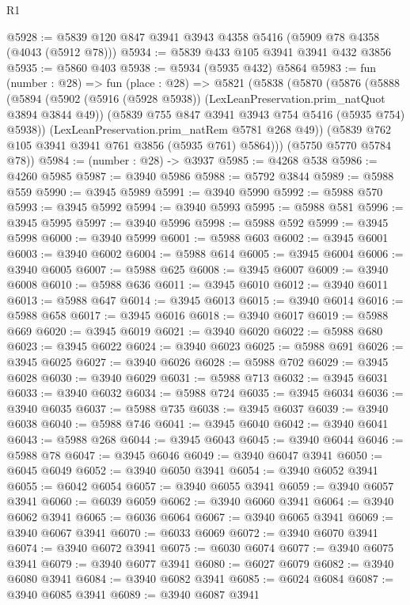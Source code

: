 \begin{lexlean}{R1}
\begin{coremodule}
@5928 := @5839 @120 @847 @3941 @3943 @4358 @5416 (@5909 @78 @4358 (@4043 (@5912 @78)))
@5934 := @5839 @433 @105 @3941 @3941 @432 @3856
@5935 := @5860 @403
@5938 := @5934 (@5935 @432) @5864
@5983 := fun (number : @28) =>
  fun (place : @28) =>
  @5821
    (@5838
      (@5870
        (@5876
          (@5888
            (@5894
              (@5902 (@5916 (@5928 @5938)) (LexLeanPreservation.prim_natQuot @3894 @3844 @49))
              (@5839 @755 @847 @3941 @3943 @754 @5416 (@5935 @754) @5938))
            (LexLeanPreservation.prim_natRem @5781 @268 @49))
          (@5839 @762 @105 @3941 @3941 @761 @3856 (@5935 @761) @5864)))
      (@5750 @5770 @5784 @78))
@5984 := (number : @28) -> @3937
@5985 := @4268 @538
@5986 := @4260 @5985
@5987 := @3940 @5986
@5988 := @5792 @3844
@5989 := @5988 @559
@5990 := @3945 @5989
@5991 := @3940 @5990
@5992 := @5988 @570
@5993 := @3945 @5992
@5994 := @3940 @5993
@5995 := @5988 @581
@5996 := @3945 @5995
@5997 := @3940 @5996
@5998 := @5988 @592
@5999 := @3945 @5998
@6000 := @3940 @5999
@6001 := @5988 @603
@6002 := @3945 @6001
@6003 := @3940 @6002
@6004 := @5988 @614
@6005 := @3945 @6004
@6006 := @3940 @6005
@6007 := @5988 @625
@6008 := @3945 @6007
@6009 := @3940 @6008
@6010 := @5988 @636
@6011 := @3945 @6010
@6012 := @3940 @6011
@6013 := @5988 @647
@6014 := @3945 @6013
@6015 := @3940 @6014
@6016 := @5988 @658
@6017 := @3945 @6016
@6018 := @3940 @6017
@6019 := @5988 @669
@6020 := @3945 @6019
@6021 := @3940 @6020
@6022 := @5988 @680
@6023 := @3945 @6022
@6024 := @3940 @6023
@6025 := @5988 @691
@6026 := @3945 @6025
@6027 := @3940 @6026
@6028 := @5988 @702
@6029 := @3945 @6028
@6030 := @3940 @6029
@6031 := @5988 @713
@6032 := @3945 @6031
@6033 := @3940 @6032
@6034 := @5988 @724
@6035 := @3945 @6034
@6036 := @3940 @6035
@6037 := @5988 @735
@6038 := @3945 @6037
@6039 := @3940 @6038
@6040 := @5988 @746
@6041 := @3945 @6040
@6042 := @3940 @6041
@6043 := @5988 @268
@6044 := @3945 @6043
@6045 := @3940 @6044
@6046 := @5988 @78
@6047 := @3945 @6046
@6049 := @3940 @6047 @3941
@6050 := @6045 @6049
@6052 := @3940 @6050 @3941
@6054 := @3940 @6052 @3941
@6055 := @6042 @6054
@6057 := @3940 @6055 @3941
@6059 := @3940 @6057 @3941
@6060 := @6039 @6059
@6062 := @3940 @6060 @3941
@6064 := @3940 @6062 @3941
@6065 := @6036 @6064
@6067 := @3940 @6065 @3941
@6069 := @3940 @6067 @3941
@6070 := @6033 @6069
@6072 := @3940 @6070 @3941
@6074 := @3940 @6072 @3941
@6075 := @6030 @6074
@6077 := @3940 @6075 @3941
@6079 := @3940 @6077 @3941
@6080 := @6027 @6079
@6082 := @3940 @6080 @3941
@6084 := @3940 @6082 @3941
@6085 := @6024 @6084
@6087 := @3940 @6085 @3941
@6089 := @3940 @6087 @3941

\end{coremodule}
\end{lexlean}
